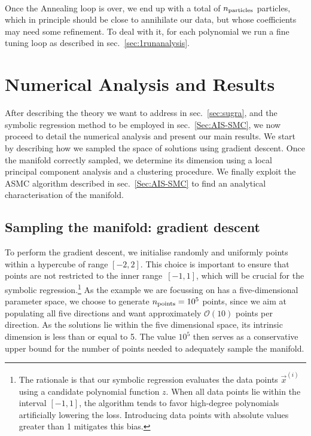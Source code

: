 \documentclass[11pt,a4paper]{article}
\begin{document}
	\paragraph{}
	Once the Annealing loop is over, we end up with a total of $n_{\rm particles}$ particles, which in principle should be close to annihilate our data, but whose coefficients may need some refinement. To deal with it, for each polynomial we run a fine tuning loop as described in sec.~\ref{sec:1runanalysis}.
	
\section{Numerical Analysis and Results} \label{sec:results}
After describing the theory we want to address in sec.~\ref{sec:sugra}, and the symbolic regression method to be employed in sec.~\ref{Sec:AIS-SMC}, we now proceed to detail the numerical analysis and present our main results. 
We start by describing how we sampled the space of solutions using gradient descent. Once the manifold correctly sampled, we determine its dimension using a local principal component analysis and a clustering procedure. We finally exploit the ASMC algorithm described in sec.~\ref{Sec:AIS-SMC} to find an analytical characterisation of the manifold.

	\subsection{Sampling the manifold: gradient descent} \label{sec:graddes}
	To perform the gradient descent, we initialise randomly and uniformly points within a hypercube of range $[-2,2]$. This choice is important to ensure that points are not restricted to the inner range~$[-1,1]$, which will be crucial for the symbolic regression.\footnote{The rationale is that our symbolic regression evaluates the data points $\vec{x}^{(i)}$ using a candidate polynomial function $z$. When all data points lie within the interval $[-1, 1]$, the algorithm tends to favor high-degree polynomials artificially lowering the loss. Introducing data points with absolute values greater than 1 mitigates this bias.} As the example we are focussing on has a five-dimensional parameter space, we choose to generate $n_{\rm points}=10^5$ points, since we aim at populating all five directions and want approximately $\mathcal{O}(10)$ points per direction. As the solutions lie within the five dimensional space, its intrinsic dimension is less than or equal to 5. The value $10^5$ then serves as a conservative upper bound for the number of points needed to adequately sample the manifold.
	
\end{document}
